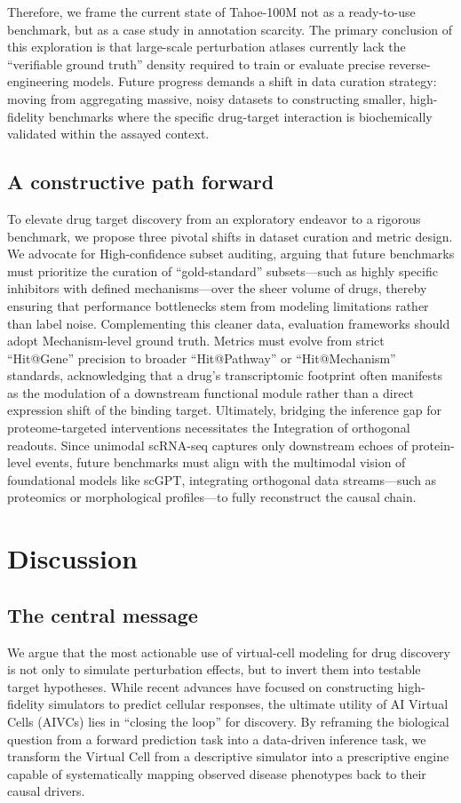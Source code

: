 \documentclass{article}
\begin{document}
Therefore, we frame the current state of Tahoe-100M not as a ready-to-use benchmark, but as a case study in annotation scarcity. The primary conclusion of this exploration is that large-scale perturbation atlases currently lack the ``verifiable ground truth'' density required to train or evaluate precise reverse-engineering models. Future progress demands a shift in data curation strategy: moving from aggregating massive, noisy datasets to constructing smaller, high-fidelity benchmarks where the specific drug-target interaction is biochemically validated within the assayed context.

\subsection{A constructive path forward}

To elevate drug target discovery from an exploratory endeavor to a rigorous benchmark, we propose three pivotal shifts in dataset curation and metric design. We advocate for High-confidence subset auditing, arguing that future benchmarks must prioritize the curation of ``gold-standard'' subsets—such as highly specific inhibitors with defined mechanisms—over the sheer volume of drugs, thereby ensuring that performance bottlenecks stem from modeling limitations rather than label noise. Complementing this cleaner data, evaluation frameworks should adopt Mechanism-level ground truth. Metrics must evolve from strict ``Hit@Gene'' precision to broader ``Hit@Pathway'' or ``Hit@Mechanism'' standards, acknowledging that a drug's transcriptomic footprint often manifests as the modulation of a downstream functional module rather than a direct expression shift of the binding target. Ultimately, bridging the inference gap for proteome-targeted interventions necessitates the Integration of orthogonal readouts. Since unimodal scRNA-seq captures only downstream echoes of protein-level events, future benchmarks must align with the multimodal vision of foundational models like scGPT, integrating orthogonal data streams—such as proteomics or morphological profiles—to fully reconstruct the causal chain.

\section{Discussion}

\subsection{The central message}
We argue that the most actionable use of virtual-cell modeling for drug discovery is not only to simulate perturbation effects, but to invert them into testable target hypotheses. While recent advances have focused on constructing high-fidelity simulators to predict cellular responses, the ultimate utility of AI Virtual Cells (AIVCs) lies in ``closing the loop'' for discovery. By reframing the biological question from a forward prediction task into a data-driven inference task, we transform the Virtual Cell from a descriptive simulator into a prescriptive engine capable of systematically mapping observed disease phenotypes back to their causal drivers.
\end{document}
